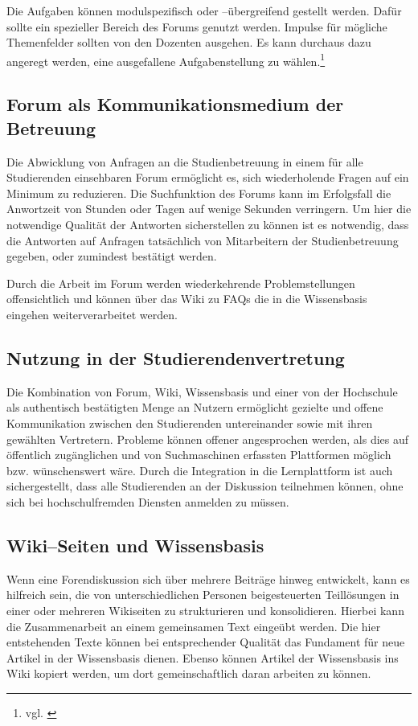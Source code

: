 Die Aufgaben können modulspezifisch oder –übergreifend gestellt werden. Dafür sollte ein spezieller Bereich des Forums genutzt werden. Impulse für mögliche Themenfelder sollten von den Dozenten ausgehen. Es kann durchaus dazu angeregt werden, eine ausgefallene Aufgabenstellung zu wählen.\footnote{vgl. \cite{dmark}}

\subsection{Forum als Kommunikationsmedium der Betreuung} %
\label{sub:forum_als_kommunikationsmedium_der_betreuung}
Die Abwicklung von Anfragen an die Studienbetreuung in einem für alle Studierenden einsehbaren Forum ermöglicht es, sich wiederholende Fragen auf ein Minimum zu reduzieren. Die Suchfunktion des Forums kann im Erfolgsfall die Anwortzeit von Stunden oder Tagen auf wenige Sekunden verringern. Um hier die notwendige Qualität der Antworten sicherstellen zu können ist es notwendig, dass die Antworten auf Anfragen tatsächlich von Mitarbeitern der Studienbetreuung gegeben, oder zumindest bestätigt werden.

Durch die Arbeit im Forum werden wiederkehrende Problemstellungen offensichtlich und können über das Wiki zu \ac{FAQ}s die in die Wissensbasis eingehen weiterverarbeitet werden.

\subsection{Nutzung in der Studierendenvertretung} %
\label{sub:nutzung_in_der_studierendenvertretung}
Die Kombination von Forum, Wiki, Wissensbasis und einer von der Hochschule als authentisch bestätigten Menge an Nutzern ermöglicht gezielte und offene Kommunikation zwischen den Studierenden untereinander sowie mit ihren gewählten Vertretern. Probleme können offener angesprochen werden, als dies auf öffentlich zugänglichen und von Suchmaschinen erfassten Plattformen möglich bzw. wünschenswert wäre. Durch die Integration in die Lernplattform ist auch sichergestellt, dass alle Studierenden an der Diskussion teilnehmen können, ohne sich bei hochschulfremden Diensten anmelden zu müssen.

\subsection{Wiki--Seiten und Wissensbasis} %
\label{sub:wiki_seiten_zur_zusammenarbeit}
Wenn eine Forendiskussion sich über mehrere Beiträge hinweg entwickelt, kann es hilfreich sein, die von unterschiedlichen Personen beigesteuerten Teillösungen in einer oder mehreren Wikiseiten zu strukturieren und konsolidieren. Hierbei kann die Zusammenarbeit an einem gemeinsamen Text eingeübt werden. Die hier entstehenden Texte können bei entsprechender Qualität das Fundament für neue Artikel in der Wissensbasis dienen. Ebenso können Artikel der Wissensbasis ins Wiki kopiert werden, um dort gemeinschaftlich daran arbeiten zu können.

